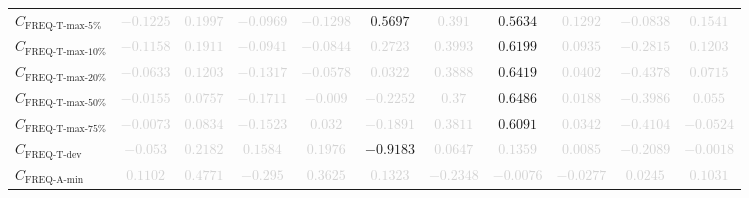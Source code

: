 \documentclass{standalone}
\newcommand{\freqmaxfivename}{\text{FREQ-T-max-5\%}}
\newcommand{\freqmaxfive}{C_{\freqmaxfivename}}
\newcommand{\freqmaxtenname}{\text{FREQ-T-max-10\%}}
\newcommand{\freqmaxten}{C_{\freqmaxtenname}}
\newcommand{\freqmaxtwentyname}{\text{FREQ-T-max-20\%}}
\newcommand{\freqmaxtwenty}{C_{\freqmaxtwentyname}}
\newcommand{\freqmaxfiftyname}{\text{FREQ-T-max-50\%}}
\newcommand{\freqmaxfifty}{C_{\freqmaxfiftyname}}
\newcommand{\freqmaxseventyfivename}{\text{FREQ-T-max-75\%}}
\newcommand{\freqmaxseventyfive}{C_{\freqmaxseventyfivename}}
\newcommand{\freqdevname}{\text{FREQ-T-dev}}
\newcommand{\freqdev}{C_{\freqdevname}}
\newcommand{\actfreqminname}{\text{FREQ-A-min}}
\newcommand{\actfreqmin}{C_{\actfreqminname}}
\begin{document}
\begin{tabular}{lcccccccccc}
$\freqmaxfive$ & \textcolor{lightgray}{$-0.1225$} & \textcolor{lightgray}{$0.1997$} & \textcolor{lightgray}{$-0.0969$} & \textcolor{lightgray}{$-0.1298$} & $0.5697$ & \textcolor{lightgray}{$0.391$} & $0.5634$ & \textcolor{lightgray}{$0.1292$} & \textcolor{lightgray}{$-0.0838$} & \textcolor{lightgray}{$0.1541$} \\ 
$\freqmaxten$ & \textcolor{lightgray}{$-0.1158$} & \textcolor{lightgray}{$0.1911$} & \textcolor{lightgray}{$-0.0941$} & \textcolor{lightgray}{$-0.0844$} & \textcolor{lightgray}{$0.2723$} & \textcolor{lightgray}{$0.3993$} & $0.6199$ & \textcolor{lightgray}{$0.0935$} & \textcolor{lightgray}{$-0.2815$} & \textcolor{lightgray}{$0.1203$} \\ 
$\freqmaxtwenty$ & \textcolor{lightgray}{$-0.0633$} & \textcolor{lightgray}{$0.1203$} & \textcolor{lightgray}{$-0.1317$} & \textcolor{lightgray}{$-0.0578$} & \textcolor{lightgray}{$0.0322$} & \textcolor{lightgray}{$0.3888$} & $0.6419$ & \textcolor{lightgray}{$0.0402$} & \textcolor{lightgray}{$-0.4378$} & \textcolor{lightgray}{$0.0715$} \\ 
$\freqmaxfifty$ & \textcolor{lightgray}{$-0.0155$} & \textcolor{lightgray}{$0.0757$} & \textcolor{lightgray}{$-0.1711$} & \textcolor{lightgray}{$-0.009$} & \textcolor{lightgray}{$-0.2252$} & \textcolor{lightgray}{$0.37$} & $0.6486$ & \textcolor{lightgray}{$0.0188$} & \textcolor{lightgray}{$-0.3986$} & \textcolor{lightgray}{$0.055$} \\ 
$\freqmaxseventyfive$ & \textcolor{lightgray}{$-0.0073$} & \textcolor{lightgray}{$0.0834$} & \textcolor{lightgray}{$-0.1523$} & \textcolor{lightgray}{$0.032$} & \textcolor{lightgray}{$-0.1891$} & \textcolor{lightgray}{$0.3811$} & $0.6091$ & \textcolor{lightgray}{$0.0342$} & \textcolor{lightgray}{$-0.4104$} & \textcolor{lightgray}{$-0.0524$} \\ 
$\freqdev$ & \textcolor{lightgray}{$-0.053$} & \textcolor{lightgray}{$0.2182$} & \textcolor{lightgray}{$0.1584$} & \textcolor{lightgray}{$0.1976$} & $-0.9183$ & \textcolor{lightgray}{$0.0647$} & \textcolor{lightgray}{$0.1359$} & \textcolor{lightgray}{$0.0085$} & \textcolor{lightgray}{$-0.2089$} & \textcolor{lightgray}{$-0.0018$} \\ 
$\actfreqmin$ & \textcolor{lightgray}{$0.1102$} & \textcolor{lightgray}{$0.4771$} & \textcolor{lightgray}{$-0.295$} & \textcolor{lightgray}{$0.3625$} & \textcolor{lightgray}{$0.1323$} & \textcolor{lightgray}{$-0.2348$} & \textcolor{lightgray}{$-0.0076$} & \textcolor{lightgray}{$-0.0277$} & \textcolor{lightgray}{$0.0245$} & \textcolor{lightgray}{$0.1031$} \\ 

\end{tabular}
\end{document}
